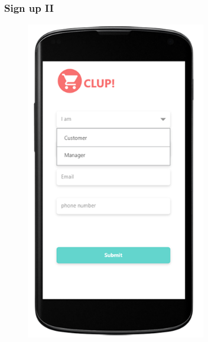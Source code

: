 \subsubsection{Sign up II}
\begin{figure}[H]
  \centering
  \includegraphics[width=0.7\textwidth,keepaspectratio]{images/8.png}
\end{figure}

